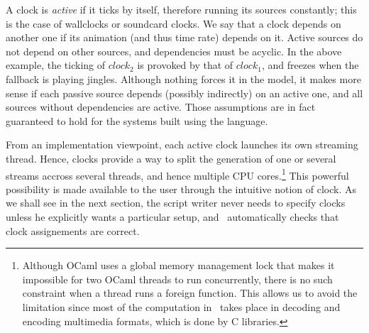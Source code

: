 A clock is \emph{active} if it ticks by itself,
therefore running its sources constantly; this
is the case of wallclocks or soundcard clocks.
We say that a clock depends on another one
if its animation (and thus time rate) depends on it.
Active sources do not depend on other sources,
and dependencies must be acyclic.
In the above example, the ticking of
$clock_2$ is provoked by that of
$clock_1$, and freezes when the fallback
is playing jingles.
Although nothing forces it in the model, it makes more sense if
each passive source depends (possibly indirectly) on an active one,
and all sources without dependencies are active.
Those assumptions are in fact guaranteed to hold for the systems
built using the \liquidsoap{} language.

From an implementation viewpoint, each active clock launches
its own streaming thread.
Hence, clocks provide a way to split the generation of one or
several streams accross several threads,
and hence multiple CPU cores.\footnote{Although OCaml uses a global
  memory management lock that makes it
  impossible for two OCaml threads to run concurrently, there is no
  such constraint when a thread runs a foreign function.
  This allows us to avoid the limitation since
  most of the computation in \liquidsoap\ takes place in decoding
  and encoding multimedia formats, which is done by C libraries.
}
This powerful possibility is made available to the user
through the intuitive notion of clock.
As we shall see in the next section,
the script writer never needs to specify clocks unless he
explicitly wants a particular setup,
and \liquidsoap\ automatically checks that clock assignements
are correct.

